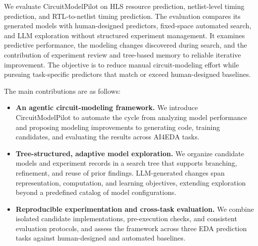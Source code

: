 We evaluate CircuitModelPilot on HLS resource prediction, netlist-level timing prediction, and RTL-to-netlist timing prediction. The evaluation compares its generated models with human-designed predictors, fixed-space automated search, and LLM exploration without structured experiment management. It examines predictive performance, the modeling changes discovered during search, and the contribution of experiment review and tree-based memory to reliable iterative improvement. The objective is to reduce manual circuit-modeling effort while pursuing task-specific predictors that match or exceed human-designed baselines.

The main contributions are as follows:
\begin{itemize}
\item \textbf{An agentic circuit-modeling framework.} We introduce CircuitModelPilot to automate the cycle from analyzing model performance and proposing modeling improvements to generating code, training candidates, and evaluating the results across AI4EDA tasks.
\item \textbf{Tree-structured, adaptive model exploration.} We organize candidate models and experiment records in a search tree that supports branching, refinement, and reuse of prior findings. LLM-generated changes span representation, computation, and learning objectives, extending exploration beyond a predefined catalog of model configurations.
\item \textbf{Reproducible experimentation and cross-task evaluation.} We combine isolated candidate implementations, pre-execution checks, and consistent evaluation protocols, and assess the framework across three EDA prediction tasks against human-designed and automated baselines.
\end{itemize}
